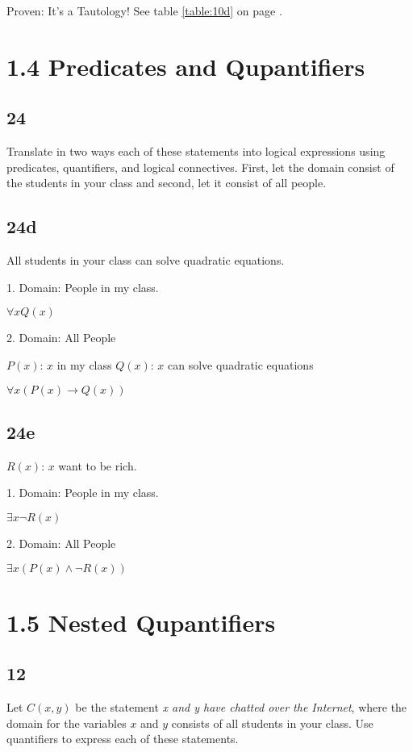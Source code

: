 \documentclass[12pt]{article}
\begin{document}
Proven: It's a Tautology! See table \ref{table:10d} on page \pageref{table:10d}.

\section{1.4 Predicates and Qupantifiers}
\subsection{24}
Translate in two ways each of these statements into logical expressions using predicates, quantifiers, and logical connectives. First, let the domain consist of the students in your class and second, let it consist of all people.
\subsection{24d}
All students in your class can solve quadratic equations.

1. Domain: People in my class.

\begin{math}
  \forall{x} Q(x)
\end{math}

2. Domain: All People

$P(x)$: $x$ in my class
$Q(x)$: $x$ can solve quadratic equations

\begin{math}
  \forall{x}(P(x)\rightarrow Q(x))
\end{math}

\subsection{24e}
$R(x)$: $x$ want to be rich.

1. Domain: People in my class.

$\exists{x} \neg R(x)$

2. Domain: All People

$\exists{x} (P(x) \wedge \neg R(x))$

\section{1.5 Nested Qupantifiers}
\subsection{12}
Let $C(x,y)$ be the statement \emph{x and y have chatted over the Internet}, where the domain for the variables $x$ and $y$ consists of all students in your class. Use quantifiers to express each of these statements.
\end{document}

